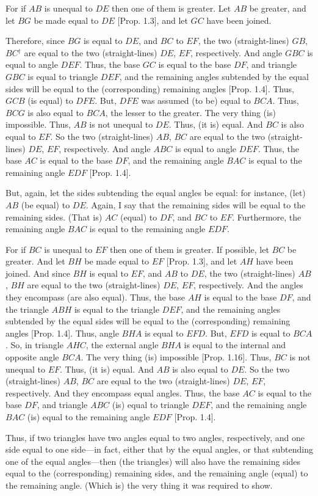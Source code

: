 \begin{Parallel}{}{}
{\epsfysize=1.5in
\centerline{}

For if $AB$ is unequal to $DE$ then one of them is greater. Let $AB$ be greater,
and let $BG$ be made equal to $DE$ [Prop. 1.3], and let $GC$ have been
joined.

Therefore, since $BG$ is equal to $DE$, and $BC$ to $EF$, the two (straight-lines)
$GB$, $BC$$^\dag$ are equal to the two (straight-lines) $DE$, $EF$, respectively. And angle
$GBC$ is equal to angle $DEF$. Thus, the base $GC$ is equal to the base $DF$,
and triangle $GBC$ is equal to triangle $DEF$, and the remaining angles 
subtended by the equal sides will
be equal to the (corresponding) remaining angles [Prop. 1.4].
Thus, $GCB$ (is equal) to $DFE$. But,  $DFE$ was assumed (to be) equal to $BCA$.
Thus, $BCG$ is also equal to $BCA$, the lesser to the greater. The very thing (is) impossible. Thus, $AB$ is not unequal to $DE$. Thus, (it is) equal. And $BC$ is
also equal to $EF$. So the two (straight-lines) $AB$, $BC$ are equal to the two (straight-lines) $DE$, $EF$, respectively. And angle $ABC$ is equal to
angle $DEF$. Thus, the base $AC$ is equal to the base $DF$, and the remaining
angle $BAC$ is equal to the remaining angle $EDF$ [Prop. 1.4].

But, again, let the sides subtending the equal angles be equal: for instance, 
(let) $AB$ (be equal) to
$DE$.  Again, I say that the remaining sides will be equal to the remaining
sides. (That is) $AC$ (equal) to $DF$, and $BC$ to $EF$. Furthermore, the remaining angle
$BAC$ is equal to the remaining angle $EDF$.

For if $BC$ is unequal to $EF$ then one of them is greater. If possible, let $BC$
be greater. And let $BH$ be made equal to $EF$ [Prop. 1.3], and let $AH$ have been joined.
And since $BH$ is equal to $EF$, and $AB$ to $DE$, the two (straight-lines) $AB$, $BH$
are equal to the two (straight-lines) $DE$, $EF$, respectively. And the angles
they encompass (are also equal). Thus, the base $AH$ is equal to the base  
$DF$, and the triangle $ABH$ is equal to the triangle $DEF$, and the
remaining angles subtended by the equal sides will be equal to the
(corresponding) remaining angles [Prop. 1.4]. Thus, angle $BHA$ 
is equal to $EFD$. But, $EFD$ is equal to $BCA$. So, in triangle $AHC$,
the external angle $BHA$ is equal to the internal and opposite angle 
$BCA$. The very thing (is) impossible [Prop. 1.16]. Thus, $BC$ is not unequal to $EF$.
Thus, (it is) equal. And $AB$ is also equal to $DE$. So the two
(straight-lines) $AB$, $BC$ are equal to the two (straight-lines) $DE$, $EF$,
respectively. And they encompass equal angles. Thus, the base $AC$ is equal
to the base $DF$, and triangle $ABC$ (is) equal to triangle $DEF$, and the
remaining angle $BAC$ (is) equal to the remaining angle $EDF$ [Prop. 1.4].

Thus, if two triangles have two angles equal to two angles, respectively, 
and one side equal to one side---in fact, either that by the equal angles, or that
subtending one of the equal angles---then (the triangles) will also have the remaining sides equal to the (corresponding) remaining sides, and the
remaining angle (equal) to the remaining angle. (Which is) the very thing it
was required to show.}
\end{Parallel}
